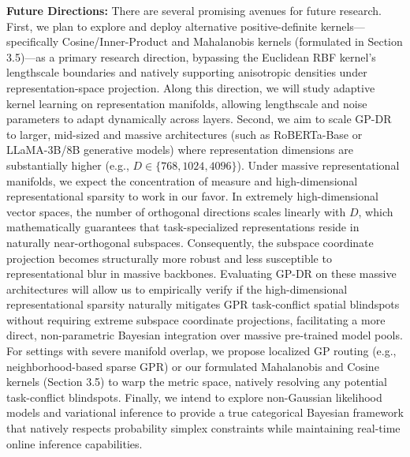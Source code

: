 \textbf{Future Directions:}
There are several promising avenues for future research. First, we plan to explore and deploy alternative positive-definite kernels—specifically Cosine/Inner-Product and Mahalanobis kernels (formulated in Section 3.5)—as a primary research direction, bypassing the Euclidean RBF kernel's lengthscale boundaries and natively supporting anisotropic densities under representation-space projection. Along this direction, we will study adaptive kernel learning on representation manifolds, allowing lengthscale and noise parameters to adapt dynamically across layers. Second, we aim to scale GP-DR to larger, mid-sized and massive architectures (such as RoBERTa-Base or LLaMA-3B/8B generative models) where representation dimensions are substantially higher (e.g., $D \in \{768, 1024, 4096\}$). Under massive representational manifolds, we expect the concentration of measure and high-dimensional representational sparsity to work in our favor. In extremely high-dimensional vector spaces, the number of orthogonal directions scales linearly with $D$, which mathematically guarantees that task-specialized representations reside in naturally near-orthogonal subspaces. Consequently, the subspace coordinate projection becomes structurally more robust and less susceptible to representational blur in massive backbones. Evaluating GP-DR on these massive architectures will allow us to empirically verify if the high-dimensional representational sparsity naturally mitigates GPR task-conflict spatial blindspots without requiring extreme subspace coordinate projections, facilitating a more direct, non-parametric Bayesian integration over massive pre-trained model pools. For settings with severe manifold overlap, we propose localized GP routing (e.g., neighborhood-based sparse GPR) or our formulated Mahalanobis and Cosine kernels (Section 3.5) to warp the metric space, natively resolving any potential task-conflict blindspots. Finally, we intend to explore non-Gaussian likelihood models and variational inference to provide a true categorical Bayesian framework that natively respects probability simplex constraints while maintaining real-time online inference capabilities.
